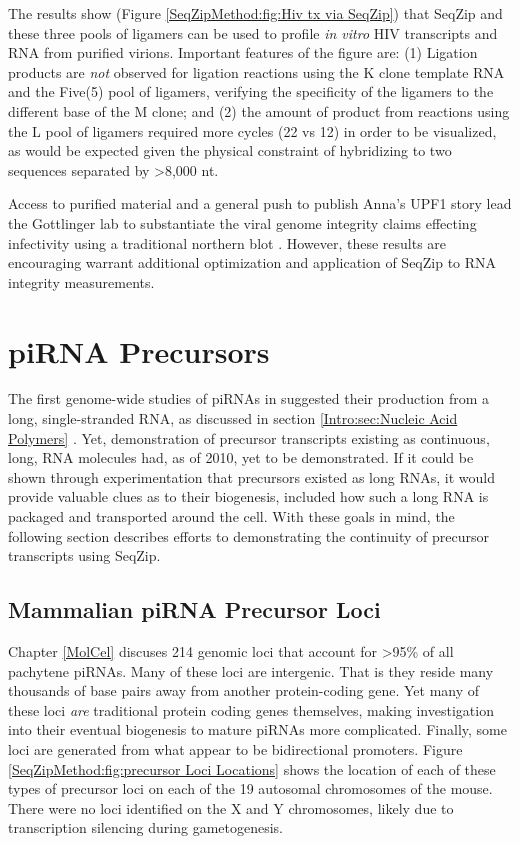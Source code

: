     The results show (Figure \ref{SeqZipMethod:fig:Hiv tx via SeqZip}) that SeqZip and these three pools of ligamers can be used to profile \textit{in vitro} HIV transcripts and RNA from purified virions. Important features of the figure are: (1) Ligation products are \textit{not} observed for ligation reactions using the K clone template RNA and the Five(5) pool of ligamers, verifying the specificity of the ligamers to the different base of the M clone; and (2) the amount of product from reactions using the L pool of ligamers required more cycles (22 vs 12) in order to be visualized, as would be expected given the physical constraint of hybridizing to two sequences separated by >8,000 nt. 

    Access to purified material and a general push to publish Anna's UPF1 story lead the Gottlinger lab to substantiate the viral genome integrity claims effecting infectivity using a traditional northern blot \citep{Serquina2013}. However, these results are encouraging warrant additional optimization and application of SeqZip to RNA integrity measurements.

\section{piRNA Precursors}
  \label{SeqZipMethod:sec:Demonstrating continuous precursor TX by SeqZip}

  The first genome-wide studies of piRNAs in \flies{} suggested their production from a long, single-stranded RNA, as discussed in section \ref{Intro:sec:Nucleic Acid Polymers} \citep{Brennecke2007,Gunawardane2007}. Yet, demonstration of precursor transcripts existing as continuous, long, RNA molecules had, as of 2010, yet to be demonstrated. If it could be shown through experimentation that precursors existed as long RNAs, it would provide valuable clues as to their biogenesis, included how such a long RNA is packaged and transported around the cell. With these goals in mind, the following section describes efforts to demonstrating the continuity of precursor transcripts using SeqZip.

  \subsection{Mammalian piRNA Precursor Loci}
    \label{SeqZipMethod:subsec:Mammalian Loci of precursor Tx}

    Chapter \ref{MolCel} discuses 214 genomic loci that account for >95\% of all pachytene piRNAs. Many of these loci are intergenic. That is they reside many thousands of base pairs away from another protein-coding gene. Yet many of these loci \textit{are} traditional protein coding genes themselves, making investigation into their eventual biogenesis to mature piRNAs more complicated. Finally, some loci are generated from what appear to be bidirectional promoters. Figure \ref{SeqZipMethod:fig:precursor Loci Locations} shows the location of each of these types of precursor loci on each of the 19 autosomal chromosomes of the mouse. There were no loci identified on the X and Y chromosomes, likely due to transcription silencing during gametogenesis. 

